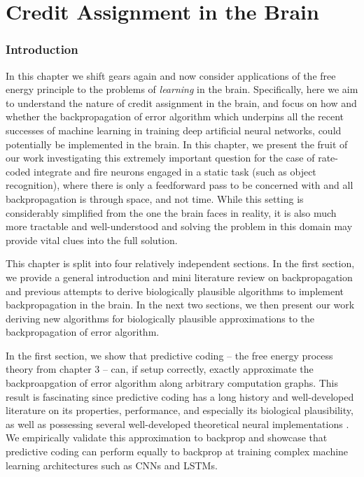\chapter{Credit Assignment in the Brain}

\subsection{Introduction}

In this chapter we shift gears again and now consider applications of the free energy principle to the problems of \emph{learning} in the brain. Specifically, here we aim to understand the nature of credit assignment in the brain, and focus on how and whether the backpropagation of error algorithm which underpins all the recent successes of machine learning in training deep artificial neural networks, could potentially be implemented in the brain. In this chapter, we present the fruit of our work investigating this extremely important question for the case of rate-coded integrate and fire neurons engaged in a static task (such as object recognition), where there is only a feedforward pass to be concerned with and all backpropagation is through space, and not time. While this setting is considerably simplified from the one the brain faces in reality, it is also much more tractable and well-understood and solving the problem in this domain may provide vital clues into the full solution. 

This chapter is split into four relatively independent sections. In the first section, we provide a general introduction and mini literature review on backpropagation and previous attempts to derive biologically plausible algorithms to implement backpropagation in the brain.  In the next two sections, we  then present our work deriving new algorithms for biologically plausible approximations to the backpropagation of error algorithm. 

In the first section, we show that predictive coding -- the free energy process theory from chapter 3 -- can, if setup correctly, exactly approximate the backproapgation of error algorithm along arbitrary computation graphs. This result is fascinating since predictive coding has a long history and well-developed literature on its properties, performance, and especially its biological plausibility, as well as possessing several well-developed theoretical neural implementations \citep{bastos2012canonical,keller2018predictive,kanai2015cerebral}. We empirically validate this approximation to backprop and showcase that predictive coding can perform equally to backprop at training complex machine learning architectures such as CNNs and LSTMs. 

